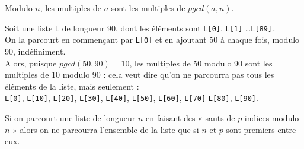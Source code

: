 \begin{propriete}[]
	Modulo $n$, les multiples de $a$ sont les multiples de $pgcd(a,n)$.
\end{propriete}

\begin{methode}[]
	Soit une liste \texttt{L} de longueur 90, dont les éléments sont \texttt{L[0]}, \texttt{L[1]} \ldots \texttt{L[89]}.\\
	On la parcourt en commençant par \texttt{L[0]} et en ajoutant 50 à chaque fois, modulo 90, indéfiniment.\\
	Alors, puisque $pgcd(50,90)=10$, les multiples de 50 modulo 90 sont les multiples de 10 modulo 90 : cela veut dire qu'on ne parcourra pas tous les éléments de la liste, mais seulement :\\
	\texttt{L[0]}, \texttt{L[10]}, \texttt{L[20]}, \texttt{L[30]}, \texttt{L[40]}, \texttt{L[50]}, \texttt{L[60]}, \texttt{L[70]} \texttt{L[80]}, \texttt{L[90]}.
\end{methode}

\begin{remarque}[]
	Si on parcourt une liste de longueur $n$ en faisant des  «  sauts de $p$ indices modulo $n$ »  alors on ne parcourra l'ensemble de la liste que si $n$ et $p$ sont premiers entre eux.
\end{remarque}



